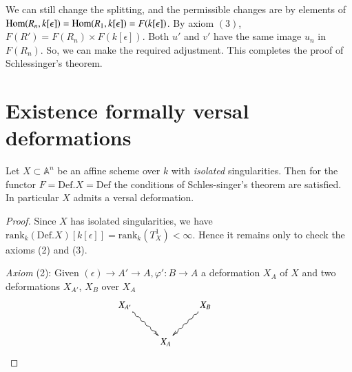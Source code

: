 {\begin{prfthm}
We can still change the splitting, and the permissible changes are by
elements of $\operatorname{Hom}(R_n, k[\epsilon])=\operatorname{Hom}(R_1,
k[\epsilon])=F(k[\epsilon])$. By axiom $(3)$, $F(R')=F(R_n)\times
F(k[\epsilon])$. Both $u'$ and $v'$ have the same image $u_n$ in
$F(R_n)$. So, we can make the required adjustment. This completes the
proof of Schlessinger's theorem. 
\end{prfthm}

\section{Existence formally versal deformations}\label{part1-sec8}\pageoriginale

\begin{theorem}\label{part1-thm8.1}%
Let $X\subset \mathbb{A}^{n}$ be an affine scheme over $k$ with {\em
isolated} singularities. Then for the functor
$F=\text{Def}. X=\text{Def}$ the conditions of Schles-singer's theorem
are satisfied. In particular $X$ admits a versal deformation. 
\end{theorem}

\begin{proof}
Since $X$ has isolated singularities, we have $\text{rank}_k
(\text{Def}. X)[k[\epsilon]]=\text{rank}_k(T^{1}_X)<\infty$. Hence it
remains only to check the axioms (2) and (3). 

{\em Axiom} (2): Given $(\epsilon)\to A' \to A, \varphi': B\to A $ a
deformation $X_A$ of $X$ and two deformations $X_{A'}$, $X_B$ over
$X_A$ 
\begin{equation*}
\vcenter{
\xymatrix{
X_{A'}\ar @ {~>}[dr]& &X_B \ar @ {~>}[dl]&\\
& X_A&
}}
\end{equation*}


\end{proof}}
